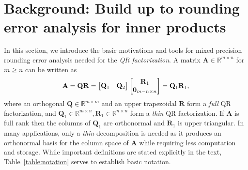 \documentclass[review,onefignum,onetabnum]{siamart190516}
\newcommand{\R}{\mathbb{R}}
\newcommand{\bb}[1]{\mathbf{#1}}
\begin{document}
\section{Background: Build up to rounding error analysis for inner products}\label{sec:background}
In this section, we introduce the basic motivations and tools for mixed precision rounding error analysis needed for the {\it QR factorization}.
A matrix $\bb{A} \in \R^{m \times n}$ for $m\geq n$ can be written as
\[\bb{A} = \bb{QR}=\begin{bmatrix}\bb{Q}_{1} & \bb{Q}_2\end{bmatrix} \begin{bmatrix}\bb{R}_{1} \\ \bb{0}_{m-n \times n}\end{bmatrix} = \bb{Q}_{1}\bb{R}_{1},\vspace{-0.3cm}
\]
where an orthogonal $\bb{Q}\in\R^{m\times m}$ and an upper trapezoidal $\bb{R}$ form a \emph{full} QR factorization, and $\bb{Q}_{1}\in\R^{m\times n},\bb{R}_{1}\in\R^{n\times n}$ form a \emph{thin} QR factorization.
If $\bb{A}$ is full rank then the columns of $\bb{Q}_{1}$ are orthonormal
and $\bb{R}_1$ is upper triangular.
In many applications, only a \emph{thin} decomposition is needed as it produces an orthonormal basis for the column space of $\bb{A}$ while requiring less computation and storage.
While important definitions are stated explicitly in the text, Table~\ref{table:notation} serves to establish basic notation.
%
\end{document}

